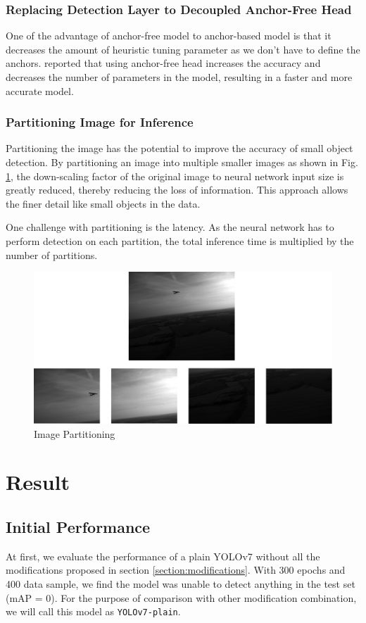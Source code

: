 \documentclass[conference]{IEEEtran}
\begin{document}
\subsubsection{Replacing Detection Layer to Decoupled Anchor-Free Head}
One of the advantage of anchor-free model to anchor-based model
is that it decreases the amount of heuristic tuning parameter as we don't
have to define the anchors. \cite{yolox}\cite{yolov6} reported that using anchor-free
head increases the accuracy and decreases the number of parameters in the model,
resulting in a faster and more accurate model.

\subsubsection{Partitioning Image for Inference}
Partitioning the image has the potential to improve the accuracy of small object detection.
By partitioning an image into multiple smaller images as shown in Fig. \ref{fig:partition}, 
the down-scaling factor of the original image to neural network input size is greatly reduced,
thereby reducing the loss of information. This approach allows the finer detail like small objects in the data.

One challenge with partitioning is the latency. As the neural network has to perform detection on each partition, the
total inference time is multiplied by the number of partitions.
\begin{figure}
  \centerline{\includegraphics[width=\linewidth]{../book/figures/crop_strat.png}}
  \caption{Image Partitioning}
  \label{fig:partition}
\end{figure}

\section{Result}
\subsection{Initial Performance}
At first, we evaluate the performance of a plain YOLOv7 without all the
modifications proposed in section \ref{section:modifications}.
With 300 epochs and 400 data sample, we find the model was unable to detect
anything in the test set (mAP = 0).
For the purpose of comparison with other modification combination,
we will call this model as \verb*|YOLOv7-plain|.
\end{document}

